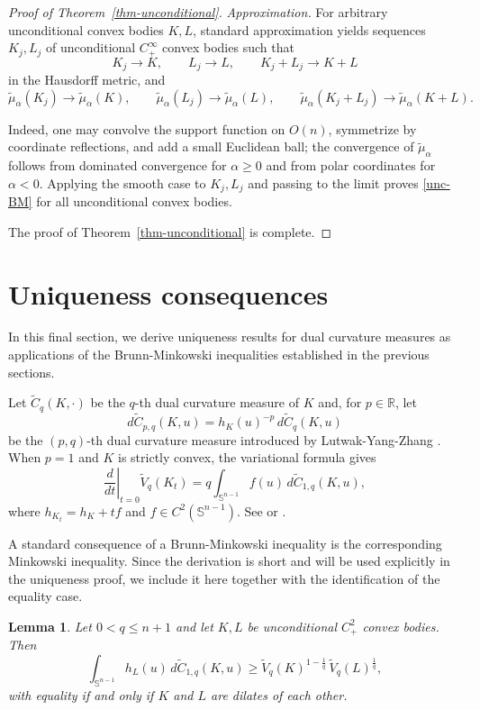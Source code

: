 \documentclass[12pt,leqno]{amsart}
\theoremstyle{plain} \newtheorem{thm}{Theorem}[section]
\theoremstyle{plain} \newtheorem{prop}[thm]{Proposition}
\theoremstyle{plain} \newtheorem{prob}[thm]{Problem}
\theoremstyle{definition} \newtheorem{defi}[thm]{Definition}
\theoremstyle{plain} \newtheorem{cor}[thm]{Corollary}
\theoremstyle{plain} \newtheorem{lem}[thm]{Lemma}
\theoremstyle{plain} \newtheorem{eg}{Example}[section]
\theoremstyle{remark} \newtheorem{rmk}[thm]{Remark}
\theoremstyle{plain} \newtheorem{conj}{Conjecture}
\numberwithin{equation}{section}
\newcommand{\tV}{\widetilde V}
\newcommand{\tC}{\widetilde C}
\newcommand{\R}{\mathbb{R}}
\begin{document}
\begin{proof}[Proof of Theorem~\ref{thm-unconditional}]
  \emph{Approximation.}
  For arbitrary unconditional convex bodies \(K,L\), standard
  approximation yields sequences \(K_j,L_j\) of unconditional \(C^\infty_+\)
  convex bodies such that
  \[
    K_j\to K,\qquad L_j\to L,\qquad
    K_j+L_j\to K+L
  \]
  in the Hausdorff metric, and
  \[
    \tilde{\mu}_\alpha(K_j)\to\tilde{\mu}_\alpha(K),\qquad
    \tilde{\mu}_\alpha(L_j)\to\tilde{\mu}_\alpha(L),\qquad
    \tilde{\mu}_\alpha(K_j+L_j)\to\tilde{\mu}_\alpha(K+L).
  \]
 
  Indeed, one may convolve the support function on \(O(n)\), symmetrize by coordinate reflections, and add a small Euclidean ball; the convergence of $\tilde{\mu}_\alpha$ follows from dominated convergence for \(\alpha\ge0\) and from polar coordinates for \(\alpha<0\). 
  Applying the smooth case to \(K_j,L_j\) and passing to
  the limit proves \eqref{unc-BM} for all unconditional convex bodies.

  The proof of Theorem~\ref{thm-unconditional} is complete.
\end{proof}


\section{Uniqueness consequences}
\label{sec-8}

In this final section, we derive uniqueness results for dual curvature
measures as applications of the Brunn-Minkowski inequalities established
in the previous sections.

Let $\tC_q(K,\cdot)$ be the $q$-th dual curvature measure of $K$ and,
for $p\in\R$, let
\[
  d\tC_{p,q}(K,u)=h_K(u)^{-p}\,d\tC_q(K,u)
\]
be the $(p,q)$-th dual curvature measure introduced by Lutwak-Yang-Zhang
\cite{LYZ18}. When $p=1$ and $K$ is strictly convex, the variational
formula gives
\begin{equation}\label{variation-dual-curvature}
  \left.\frac{d}{dt}\right|_{t=0}\tV_q(K_t)
  =q\int_{\mathbb S^{n-1}} f(u)\,d\tC_{1,q}(K,u),
\end{equation}
where $h_{K_t}=h_K+t f$ and $f\in C^2(\mathbb S^{n-1})$. See \cite[Theorem~3.1]{HLYZ16} or \cite[Section~3]{XZ22}.

A standard consequence of a Brunn-Minkowski inequality is the
corresponding Minkowski inequality.  Since the derivation is short and
will be used explicitly in the uniqueness proof, we include it here
together with the identification of the equality case.

\begin{lem}\label{lem-Minkowski}
  Let $0<q\le n+1$ and let $K,L$ be unconditional $C^2_+$ convex bodies.
  Then
  \begin{equation}\label{Mink-unc}
    \int_{\mathbb S^{n-1}} h_L(u)\,d\tC_{1,q}(K,u)
    \ge \tV_q(K)^{1-\frac1q}\,\tV_q(L)^{\frac1q},
  \end{equation}
  with equality if and only if $K$ and $L$ are dilates of each other.
\end{lem}
\end{document}
